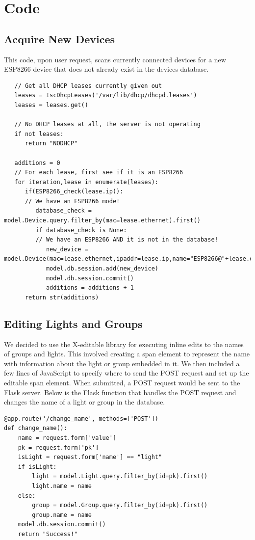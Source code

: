 \documentclass[10pt,draftclsnofoot,onecolumn]{IEEEtran}
\begin{document}
\section{Code}

\subsection{Acquire New Devices}

This code, upon user request, scans currently connected devices for a new
ESP8266 device that does not already exist in the devices database.

\begin{lstlisting}
   // Get all DHCP leases currently given out
   leases = IscDhcpLeases('/var/lib/dhcp/dhcpd.leases')
   leases = leases.get()

   // No DHCP leases at all, the server is not operating
   if not leases:
      return "NODHCP"

   additions = 0
   // For each lease, first see if it is an ESP8266
   for iteration,lease in enumerate(leases):
      if(ESP8266_check(lease.ip)):
      // We have an ESP8266 mode!
         database_check = model.Device.query.filter_by(mac=lease.ethernet).first()
         if database_check is None:
         // We have an ESP8266 AND it is not in the database!
            new_device = model.Device(mac=lease.ethernet,ipaddr=lease.ip,name="ESP8266@"+lease.ethernet)
            model.db.session.add(new_device)
            model.db.session.commit()
            additions = additions + 1
      return str(additions)
   \end{lstlisting}

\subsection{Editing Lights and Groups}

We decided to use the X-editable library for executing inline edits to the
names of groups and lights. This involved creating a span element to represent
the name with information about the light or group embedded in it. We then
included a few lines of JavaScript to specify where to send the POST request
and set up the editable span element. When submitted, a POST request would be
sent to the Flask server. Below is the Flask function that handles the POST
request and changes the name of a light or group in the database.

\begin{lstlisting}
@app.route('/change_name', methods=['POST'])
def change_name():
    name = request.form['value']
    pk = request.form['pk']
    isLight = request.form['name'] == "light"
    if isLight:
        light = model.Light.query.filter_by(id=pk).first()
        light.name = name
    else:
        group = model.Group.query.filter_by(id=pk).first()
        group.name = name
    model.db.session.commit()
    return "Success!"
\end{lstlisting}
\end{document}
